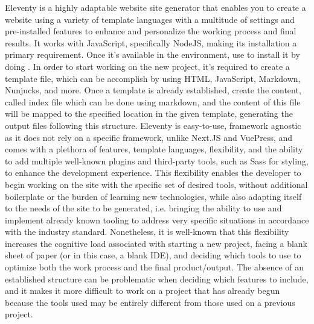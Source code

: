 \markdownRendererDocumentBegin
{}\markdownRendererInterblockSeparator
{}Eleventy is a highly adaptable website site generator that enables you to create a website using a variety of template languages with a multitude of settings and pre-installed features to enhance and personalize the working process and final results.\markdownRendererInterblockSeparator
{}It works with JavaScript, specifically NodeJS, making its installation a primary requirement. Once it's available in the environment, use  to install it by doing .\markdownRendererInterblockSeparator
{}In order to start working on the new project, it's required to create a template file, which can be accomplish by using HTML, JavaScript, Markdown, Nunjucks, and more. Once a template is already established, create the content, called index file which can be done using markdown, and the content of this file will be mapped to the specified location in the given template, generating the output files following this structure.\markdownRendererInterblockSeparator
{}Eleventy is easy-to-use, framework agnostic as it does not rely on a specific framework, unlike Next.JS and VuePress, and comes with a plethora of features, template languages, flexibility, and the ability to add multiple well-known plugins and third-party tools, such as Sass for styling, to enhance the development experience. This flexibility enables the developer to begin working on the site with the specific set of desired tools, without additional boilerplate or the burden of learning new technologies, while also adapting itself to the needs of the site to be generated, i.e. bringing the ability to use and implement already known tooling to address very specific situations in accordance with the industry standard.\markdownRendererInterblockSeparator
{}Nonetheless, it is well-known that this flexibility increases the cognitive load associated with starting a new project, facing a blank sheet of paper (or in this case, a blank IDE), and deciding which tools to use to optimize both the work process and the final product/output. The absence of an established structure can be problematic when deciding which features to include, and it makes it more difficult to work on a project that has already begun because the tools used may be entirely different from those used on a previous project.\markdownRendererDocumentEnd